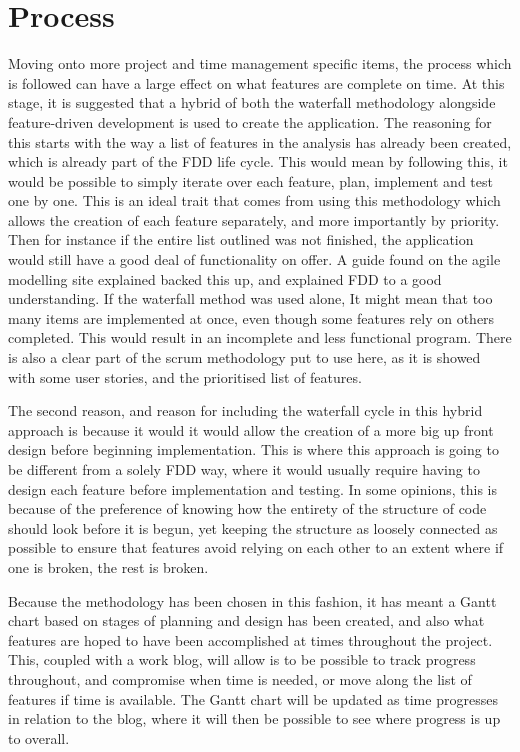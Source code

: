 \section{Process}
Moving onto more project and time management specific items, the process which is followed can have a large effect on what features are complete on time. At this stage, it is suggested that a hybrid of both the waterfall methodology alongside feature-driven development is used to create the application. The reasoning for this starts with the way a list of features in the analysis has already been created, which is already part of the FDD life cycle. This would mean by following this, it would be possible to simply iterate over each feature, plan, implement and test one by one. This is an ideal trait that comes from using this methodology which allows the creation of each feature separately, and more importantly by priority. Then for instance if the entire list outlined was not finished, the application would still have a good deal of functionality on offer. A guide found on the agile modelling site\cite{FDD} explained backed this up, and explained FDD to a good understanding. If the waterfall method was used alone, It might mean that too many items are implemented at once, even though some features rely on others completed. This would result in an incomplete and less functional program. There is also a clear part of the scrum methodology put to use here, as it is showed with some user stories, and the prioritised list of features.

The second reason, and reason for including the waterfall cycle in this hybrid approach is because it would it would allow the creation of a more big up front design before beginning implementation. This is where this approach is going to be different from a solely FDD way, where it would usually require having to design each feature before implementation and testing. In some opinions, this is because of the preference of knowing how the entirety of the structure of code should look before it is begun, yet keeping the structure as loosely connected as possible to ensure that features avoid relying on each other to an extent where if one is broken, the rest is broken. 

Because the methodology has been chosen in this fashion, it has meant a Gantt chart based on stages of planning and design has been created, and also what features are hoped to have been accomplished at times throughout the project. This, coupled with a work blog, will allow is to be possible to track progress throughout, and compromise when time is needed, or move along the list of features if time is available. The Gantt chart will be updated as time progresses in relation to the blog, where it will then be possible to see where progress is up to overall.

